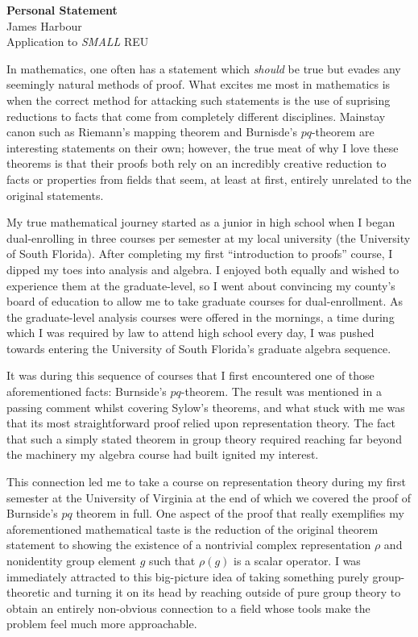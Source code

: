 \documentclass[11pt]{article}
\begin{document}
\begin{center}
  \textbf{Personal Statement}\\
  James Harbour \\
  Application to \emph{SMALL} REU
\end{center}

In mathematics, one often has a statement which \emph{should} be true but evades any seemingly natural methods of proof. What excites me most in mathematics is when the correct method for attacking such statements is the use of suprising reductions to facts that come from completely different disciplines. Mainstay canon such as Riemann's mapping theorem and Burnisde's $pq$-theorem are interesting statements on their own; however, the true meat of why I love these theorems is that their proofs both rely on an incredibly creative reduction to facts or properties from fields that seem, at least at first, entirely unrelated to the original statements.

My true mathematical journey started as a junior in high school when I began dual-enrolling in three courses per semester at my local university (the University of South Florida). After completing my first ``introduction to proofs'' course, I dipped my toes into analysis and algebra. I enjoyed both equally and wished to experience them at the graduate-level, so I went about convincing my county's board of education to allow me to take graduate courses for dual-enrollment. As the graduate-level analysis courses were offered in the mornings, a time during which I was required by law to attend high school every day, I was pushed towards entering the University of South Florida's graduate algebra sequence.

It was during this sequence of courses that I first encountered one of those aforementioned facts: Burnside's $pq$-theorem. The result was mentioned in a passing comment whilst covering Sylow's theorems, and what stuck with me was that its most straightforward proof relied upon representation theory. The fact that such a simply stated theorem in group theory required reaching far beyond the machinery my algebra course had built ignited my interest.

This connection led me to take a course on representation theory during my first semester at the University of Virginia at the end of which we covered the proof of Burnside's $pq$ theorem in full. One aspect of the proof that really exemplifies my aforementioned mathematical taste is the reduction of the original theorem statement to showing the existence of a nontrivial complex representation $\rho$ and nonidentity group element $g$ such that $\rho(g)$ is a scalar operator. I was immediately attracted to this big-picture idea of taking something purely group-theoretic and turning it on its head by reaching outside of pure group theory to obtain an entirely non-obvious connection to a field whose tools make the problem feel much more approachable.
\end{document}
